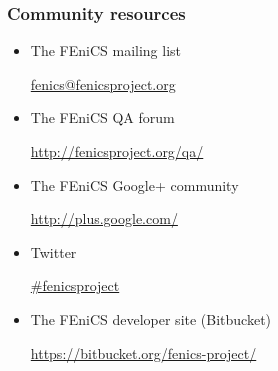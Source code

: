 \begin{frame}
  \frametitle{Community resources}

  \linespread{1.5}
  \begin{itemize}
  \item
    The FEniCS mailing list

    \url{fenics@fenicsproject.org}
  \item
    The FEniCS QA forum

    \url{http://fenicsproject.org/qa/}
  \item
    The FEniCS Google+ community

    \url{http://plus.google.com/}
  \item
    Twitter

    \url{\#fenicsproject}
  \item
    The FEniCS developer site (Bitbucket)

    \url{https://bitbucket.org/fenics-project/}
  \end{itemize}
  \linespread{1.0}

  \vspace{0.1cm}

  \begin{center}
    \underline{}
  \end{center}

\end{frame}
